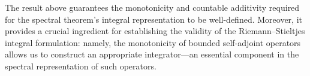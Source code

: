 


The result above guarantees the monotonicity and countable additivity required for the spectral theorem's integral representation to be well-defined. Moreover, it provides a crucial ingredient for establishing the validity of the Riemann–Stieltjes integral formulation: namely, the monotonicity of bounded self-adjoint operators allows us to construct an appropriate integrator—an essential component in the spectral representation of such operators.



